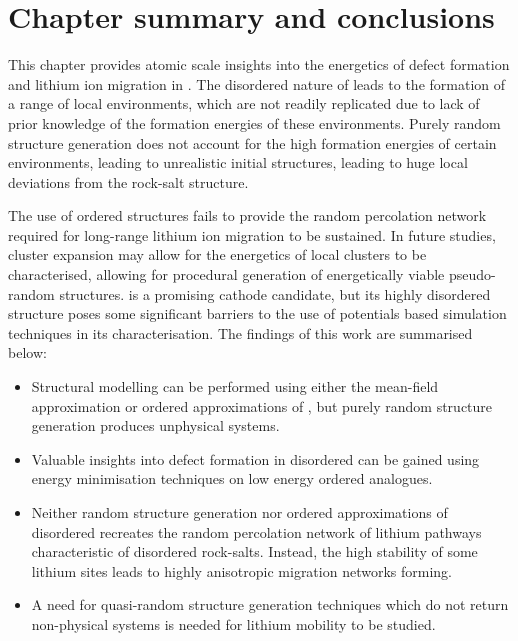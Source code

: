 \newpage
\section{Chapter summary and conclusions}
This chapter provides atomic scale insights into the energetics of defect formation and lithium ion migration in .
The disordered nature of  leads to the formation of a range of local environments, which are not readily replicated due to lack of prior knowledge of the formation energies of these environments.
Purely random structure generation does not account for the high formation energies of certain environments, leading to unrealistic initial structures, leading to huge local deviations from the rock-salt structure.

The use of ordered structures fails to provide the random percolation network required for long-range lithium ion migration to be sustained.
In future studies, cluster expansion\cite{Chang2019} may allow for the energetics of local clusters to be characterised, allowing for procedural generation of energetically viable pseudo-random structures.
 is a promising cathode candidate, but its highly disordered structure poses some significant barriers to the use of potentials based simulation techniques in its characterisation.
The findings of this work are summarised below:

\begin{itemize}
	\item Structural modelling can be performed using either the mean-field approximation or ordered approximations of , but purely random structure generation produces unphysical systems.
	\item Valuable insights into defect formation in disordered  can be gained using energy minimisation techniques on low energy ordered analogues.
	\item Neither random structure generation nor ordered approximations of disordered  recreates the random percolation network of lithium pathways characteristic of disordered rock-salts.
	Instead, the high stability of some lithium sites leads to highly anisotropic migration networks forming.
	\item A need for quasi-random structure generation techniques which do not return non-physical systems is needed for  lithium mobility to be studied.
\end{itemize}



\newpage
